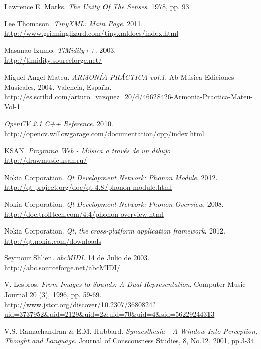 \begin{thebibliography}{9}
 Lawrence E. Marks. \emph{The Unity Of The Senses}. 1978, pp. 93.
 
  Lee Thomason. \emph{TinyXML: Main Page}. 2011.\\
  \url{http://www.grinninglizard.com/tinyxmldocs/index.html}

  Masanao Izumo. \emph{TiMidity++}. 2003.\\
  \url{http://timidity.sourceforge.net/}
  
	Miguel Angel Mateu. \emph{ARMONÍA PRÁCTICA vol.1}. Ab Música Ediciones Musicales, 2004. Valencia, España.\\
	\url{http://es.scribd.com/arturo_vazquez_20/d/46628426-Armonia-Practica-Mateu-Vol-1}
  
  \emph{OpenCV 2.1 C++ Reference}. 2010.\\
  \url{http://opencv.willowgarage.com/documentation/cpp/index.html}

 KSAN. \emph{Programa Web - Música a través de un dibujo}\\
\url{http://drawmusic.ksan.ru/}

  Nokia Corporation. \emph{Qt Development Network: Phonon Module}. 2012.\\
 \url{http://qt-project.org/doc/qt-4.8/phonon-module.html}
 
  Nokia Corporation. \emph{Qt Development Network: Phonon Overview}. 2008.\\
 \url{http://doc.trolltech.com/4.4/phonon-overview.html}

  Nokia Corporation. \emph{Qt, the cross-platform application framework}. 2012.\\
  \url{http://qt.nokia.com/downloads} 
 
  Seymour Shlien. \emph{abcMIDI}. 14 de Julio de 2003.\\
  \url{http://abc.sourceforge.net/abcMIDI/} 

 V. Lesbros. \emph{From Images to Sounds: A Dual Representation}. Computer Music Journal 20 (3), 1996, pp. 59-69.\\
 \url{http://www.jstor.org/discover/10.2307/3680824?uid=3737952&uid=2129&uid=2&uid=70&uid=4&sid=56229244313}

  V.S. Ramachandran \& E.M. Hubbard. \emph{Synaesthesia - A Window Into Perception, Thought and Language}. Journal of Conscousness Studies, 8, No.12, 2001, pp.3-34.


\end{thebibliography}

